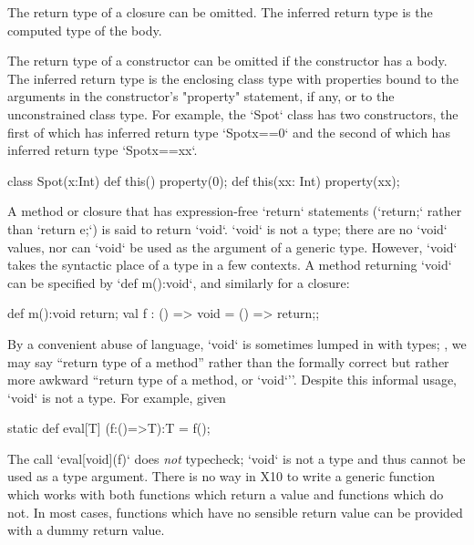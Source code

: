 The return type of a closure can be omitted.
The inferred return type is the computed type of the body.

The return type of a constructor can be omitted if the
constructor has a body.
The inferred return type is the enclosing class type with
properties bound to the arguments in the constructor's \xcd"property"
statement, if any, or to the unconstrained class type.
For example, the \xcd`Spot` class has two constructors, the first of which has
inferred return type \xcd`Spot{x==0}` and the second of which has 
inferred return type \xcd`Spot{x==xx}`. 
\begin{xten}
class Spot(x:Int) {
  def this() {property(0);}
  def this(xx: Int) { property(xx); }
}
\end{xten}



A method or closure that has expression-free \xcd`return` statements
(\xcd`return;` rather than \xcd`return e;`) is said to return \xcd`void`.
\xcd`void` is not a type; there are no \xcd`void` values, nor can \xcd`void`
be used as the argument of a generic type. However, \xcd`void` takes the
syntactic place of a type in a few contexts. A method returning \xcd`void` can be specified by
\xcd`def m():void`, and similarly for a closure: 

\begin{xten}
def m():void {return;}
val f : () => void = () => {return;};
\end{xten}

By a convenient abuse of language, \xcd`void` is sometimes
lumped in with types; \eg, we may say ``return type of a method'' rather than
the formally correct but rather more awkward ``return type of a method, or
\xcd`void`''.   Despite this informal usage, \xcd`void` is not a type.  For
example, given 
\begin{xten}
  static def eval[T] (f:()=>T):T = f();
\end{xten}
\noindent
The call \xcd`eval[void](f)` does {\em not} typecheck; \xcd`void` is not a
type and thus cannot be used as a type argument.  There is no way in X10 to
write a generic function which works with both functions which return a value
and functions which do not.  In most cases, functions which have no sensible
return value can be provided with a dummy return value.

